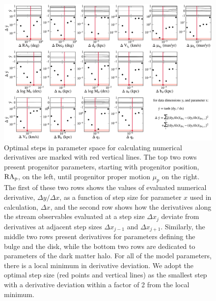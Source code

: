 \documentclass[modern]{aastex61}
\begin{document}
\begin{figure}
\begin{center}
\includegraphics[width=\textwidth]{derivative_steps.pdf}
\caption{Optimal steps in parameter space for calculating numerical derivatives are marked with red vertical lines.
The top two rows present progenitor parameters, starting with progenitor position, $\rm RA_p$, on the left, until progenitor proper motion $\mu_p$ on the right.
The first of these two rows shows the values of evaluated numerical derivative, $\Delta y/\Delta x$, as a function of step size for parameter $x$ used in calculation, $\Delta x$, and the second row shows how the derivatives along the stream observables evaluated at a step size $\Delta x_j$ deviate from derivatives at adjacent step sizes $\Delta x_{j-1}$ and $\Delta x_{j+1}$.
Similarly, the middle two rows present derivatives for parameters defining the bulge and the disk, while the bottom two rows are dedicated to parameters of the dark matter halo.
For all of the model parameters, there is a local minimum in derivative deviation.
We adopt the optimal step size (red points and vertical lines) as the smallest step with a derivative deviation within a factor of 2 from the local minimum.
}
\label{fig:derivative_conv}
\end{center}
\end{figure}
\end{document}
